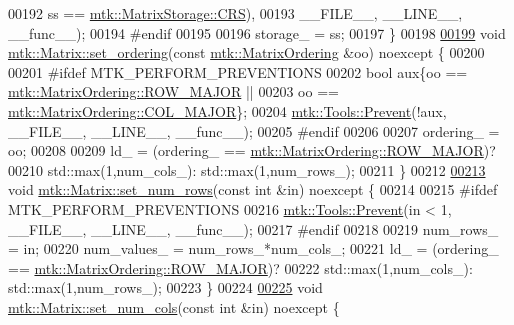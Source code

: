 \begin{DoxyCode}
00192                         ss == \hyperlink{namespacemtk_ga25b67ec6a2afeee69f9bb196a9c66619a22d51ee0c812123c541f2a1bdf794fd1}{mtk::MatrixStorage::CRS}),
00193                       \_\_FILE\_\_, \_\_LINE\_\_, \_\_func\_\_);
00194 \textcolor{preprocessor}{  #endif}
00195 
00196   storage\_ = ss;
00197 \}
00198 
\hypertarget{mtk__matrix_8cc_source_l00199}{}\hyperlink{classmtk_1_1Matrix_a8bdaf3f8307b00a36843359f165e1f17}{00199} \textcolor{keywordtype}{void} \hyperlink{classmtk_1_1Matrix_a8bdaf3f8307b00a36843359f165e1f17}{mtk::Matrix::set\_ordering}(\textcolor{keyword}{const} 
      \hyperlink{group__c02-enums_ga622801bd9f912d0f976c3e383f5f581c}{mtk::MatrixOrdering} &oo) noexcept \{
00200 
00201 \textcolor{preprocessor}{  #ifdef MTK\_PERFORM\_PREVENTIONS}
00202   \textcolor{keywordtype}{bool} aux\{oo == \hyperlink{namespacemtk_ga622801bd9f912d0f976c3e383f5f581ca21541962976d7709c26e9cd8385bd648}{mtk::MatrixOrdering::ROW\_MAJOR} ||
00203            oo == \hyperlink{namespacemtk_ga622801bd9f912d0f976c3e383f5f581ca34d2765ffc490951febdcca04bc4f7cd}{mtk::MatrixOrdering::COL\_MAJOR}\};
00204   \hyperlink{classmtk_1_1Tools_a332324c6f25e66be9dff48c5987a3b9f}{mtk::Tools::Prevent}(!aux, \_\_FILE\_\_, \_\_LINE\_\_, \_\_func\_\_);
00205 \textcolor{preprocessor}{  #endif}
00206 
00207   ordering\_ = oo;
00208 
00209   ld\_ = (ordering\_ == \hyperlink{namespacemtk_ga622801bd9f912d0f976c3e383f5f581ca21541962976d7709c26e9cd8385bd648}{mtk::MatrixOrdering::ROW\_MAJOR})?
00210     std::max(1,num\_cols\_): std::max(1,num\_rows\_);
00211 \}
00212 
\hypertarget{mtk__matrix_8cc_source_l00213}{}\hyperlink{classmtk_1_1Matrix_aa4aee0281421c22d9af273b7beb84306}{00213} \textcolor{keywordtype}{void} \hyperlink{classmtk_1_1Matrix_aa4aee0281421c22d9af273b7beb84306}{mtk::Matrix::set\_num\_rows}(\textcolor{keyword}{const} \textcolor{keywordtype}{int} &in) noexcept \{
00214 
00215 \textcolor{preprocessor}{  #ifdef MTK\_PERFORM\_PREVENTIONS}
00216   \hyperlink{classmtk_1_1Tools_a332324c6f25e66be9dff48c5987a3b9f}{mtk::Tools::Prevent}(in < 1, \_\_FILE\_\_, \_\_LINE\_\_, \_\_func\_\_);
00217 \textcolor{preprocessor}{  #endif}
00218 
00219   num\_rows\_ = in;
00220   num\_values\_ = num\_rows\_*num\_cols\_;
00221   ld\_ = (ordering\_ == \hyperlink{namespacemtk_ga622801bd9f912d0f976c3e383f5f581ca21541962976d7709c26e9cd8385bd648}{mtk::MatrixOrdering::ROW\_MAJOR})?
00222     std::max(1,num\_cols\_): std::max(1,num\_rows\_);
00223 \}
00224 
\hypertarget{mtk__matrix_8cc_source_l00225}{}\hyperlink{classmtk_1_1Matrix_aad6b4ced4a0447cc7bf2347fe86fd722}{00225} \textcolor{keywordtype}{void} \hyperlink{classmtk_1_1Matrix_aad6b4ced4a0447cc7bf2347fe86fd722}{mtk::Matrix::set\_num\_cols}(\textcolor{keyword}{const} \textcolor{keywordtype}{int} &in) noexcept \{

\end{DoxyCode}
